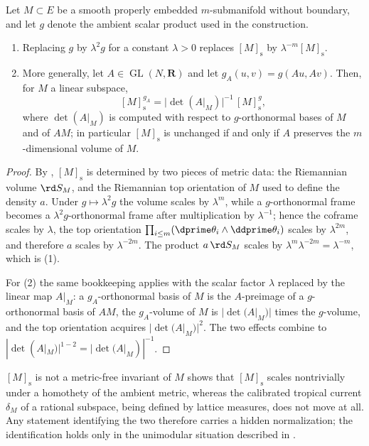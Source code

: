 \begin{proposition}
\label{prop:ch14-berndtsson-metric-dependence}
Let $M\subset E$ be a smooth properly embedded $m$-submanifold without
boundary, and let $g$ denote the ambient
scalar product used in the construction.
\begin{enumerate}
\item Replacing $g$ by $\lambda^2g$ for a constant $\lambda>0$ replaces
  $[M]_{\mathrm s}$ by $\lambda^{-m}[M]_{\mathrm s}$.
\item More generally, let $A\in\operatorname{GL}(N,\mathbf R)$ and let
  $g_A(u,v)=g(Au,Av)$.  Then, for $M$ a linear subspace,
  \[
   [M]_{\mathrm s}^{g_A}
   =\bigl|\!\det(A|_M)\bigr|^{-1}\,[M]_{\mathrm s}^{g},
  \]
  where $\det(A|_M)$ is computed with respect to $g$-orthonormal bases of $M$
  and of $AM$; in particular $[M]_{\mathrm s}$ is unchanged if and only if
  $A$ preserves the $m$-dimensional volume of $M$.
\end{enumerate}
\end{proposition}

\begin{proof}
By , $[M]_{\mathrm s}$ is determined by two
pieces of metric data: the Riemannian volume $\rd S_M$, and the Riemannian
top orientation of $M$ used to define the density $a$.  Under
$g\mapsto\lambda^2g$ the volume scales by $\lambda^{m}$, while a
$g$-orthonormal frame becomes a $\lambda^2g$-orthonormal frame after
multiplication by $\lambda^{-1}$; hence the coframe scales by $\lambda$, the top
orientation $\prod_{i\le m}(\dprime\theta_i\wedge\ddprime\theta_i)$ scales by
$\lambda^{2m}$, and therefore $a$ scales by $\lambda^{-2m}$.  The product
$a\,\rd S_M$ scales by $\lambda^{m}\lambda^{-2m}=\lambda^{-m}$, which is (1).

For (2) the same bookkeeping applies with the scalar factor $\lambda$
replaced by the linear map $A|_M$: a $g_A$-orthonormal basis of $M$ is the
$A$-preimage of a $g$-orthonormal basis of $AM$, the $g_A$-volume of $M$ is
$|\det(A|_M)|$ times the $g$-volume, and the top orientation acquires
$|\det(A|_M)|^{2}$.  The two effects combine to
$|\det(A|_M)|^{1-2}=|\det(A|_M)|^{-1}$.
\end{proof}

\par\noindent\begin{minipage}{\linewidth}
\begin{warning}{$[M]_{\mathrm s}$ is not a metric-free invariant of $M$}
 shows that
$[M]_{\mathrm s}$ scales nontrivially under a homothety of the ambient
metric, whereas the calibrated tropical current $\delta_M$ of a rational
subspace, being defined by lattice measures, does not move at all.  Any
statement identifying the two therefore carries a hidden normalization; the
identification holds only in the unimodular situation described in
.
\end{warning}
\end{minipage}\par

